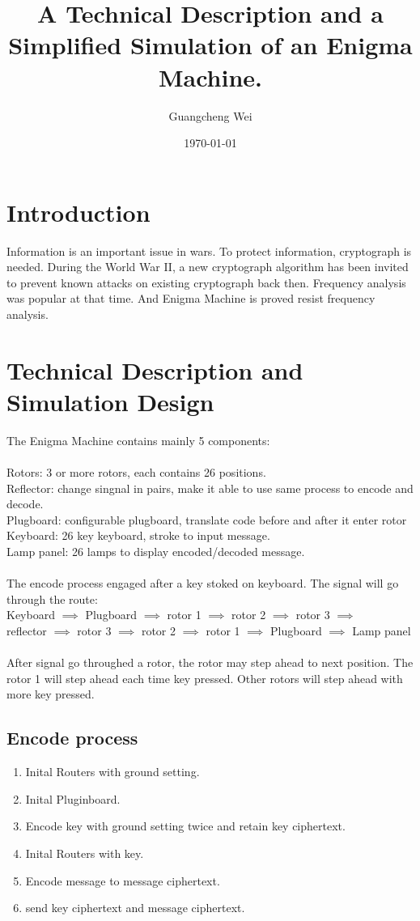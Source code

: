 \documentclass[11pt,a4paper]{article}
\begin{document}
\title{A Technical Description and a Simplified Simulation of an Enigma Machine.}
\author{Guangcheng Wei}
\date{\normalsize\today}
\maketitle

\section{Introduction}
Information is an important issue in wars. To protect information, cryptograph is needed.
During the World War II, a new cryptograph algorithm has been invited to prevent known attacks on existing cryptograph back then. Frequency analysis was popular at that time. And Enigma Machine is proved resist frequency analysis.\cite{wiki:Enigma}

\section{Technical Description and Simulation Design}
The Enigma Machine contains mainly 5 components:\\\\
Rotors: 3 or more rotors, each contains 26 positions.\\
Reflector: change singnal in pairs, make it able to use same process to encode and decode.\\
Plugboard: configurable plugboard, translate code before and after it enter rotor\\
Keyboard: 26 key keyboard, stroke to input message.\\
Lamp panel: 26 lamps to display encoded/decoded message.\\\\
The encode process engaged after a key stoked on keyboard.
The signal will go through the route:\\
Keyboard $\implies$ Plugboard $\implies$ rotor 1 $\implies$ rotor 2 $\implies$ rotor 3 $\implies$\\
reflector $\implies$ rotor 3 $\implies$ rotor 2 $\implies$ rotor 1 $\implies$ Plugboard $\implies$ Lamp panel\\\\
After signal go throughed a rotor, the rotor may step ahead to next position. The rotor 1 will step ahead each time key pressed. Other rotors will step ahead with more key pressed.

\subsection{Encode process}
\begin{enumerate}
\item Inital Routers with ground setting.
\item Inital Pluginboard.
\item Encode key with ground setting twice and retain key ciphertext.
\item Inital Routers with key.
\item Encode message to message ciphertext.
\item send key ciphertext and message ciphertext.
\end{enumerate}
\end{document}
